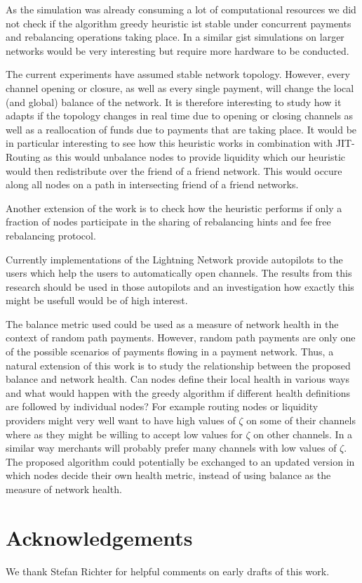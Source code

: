 \documentclass[a4paper]{paper}
\begin{document}
As the simulation was already consuming a lot of computational resources we did not check if the algorithm greedy heuristic ist stable under concurrent payments and rebalancing operations taking place.
In a similar gist simulations on larger networks would be very interesting but require more hardware to be conducted.

The current experiments have assumed stable network topology. 
However, every channel opening or closure, as well as every single payment, will change the local (and global) balance of the network.
It is therefore interesting to study how it adapts if the topology changes in real time due to opening or closing channels as well as a reallocation of funds due to payments that are taking place.
It would be in particular interesting to see how this heuristic works in combination with JIT-Routing as this would unbalance nodes to provide liquidity which our heuristic would then redistribute over the friend of a friend network.
This would occure along all nodes on a path in intersecting friend of a friend networks.

Another extension of the work is to check how the heuristic performs if only a fraction of nodes participate in the sharing of rebalancing hints and fee free rebalancing protocol.

Currently implementations of the Lightning Network provide autopilots to the users which help the users to automatically open channels.
The results from this research should be used in those autopilots and an investigation how exactly this might be usefull would be of high interest.

The balance metric used could be used as a measure of network health in the context of random path payments. 
However, random path payments are only one of the possible scenarios of payments flowing in a payment network. 
Thus, a natural extension of this work is to 
study the relationship between the proposed balance and network health. Can nodes define their local health in various ways and what would happen with the greedy algorithm if different health definitions are followed by individual nodes?
For example routing nodes or liquidity providers might very well want to have high values of $\zeta$ on some of their channels where as they might be willing to accept low values for $\zeta$ on other channels.
In a similar way merchants will probably prefer many channels with low values of $\zeta$.
The proposed algorithm could potentially be exchanged to an updated version in which nodes decide their own health metric,
instead of using balance as the measure of network health.

\section{Acknowledgements}
\label{sec:ack}
We thank Stefan Richter for helpful comments on early drafts of this work.




\end{document}
